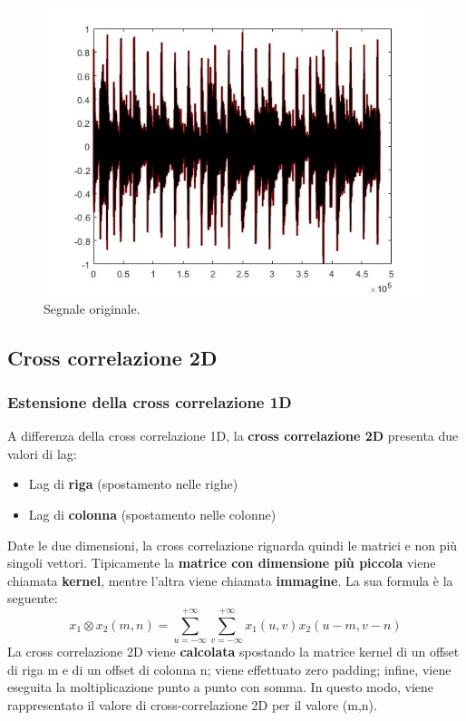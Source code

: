 \documentclass[a4paper]{article}
\begin{document}
	\begin{figure}[!htp]
		\centering
		\includegraphics[width=.9\textwidth]{img/lab/cross-correlazione-10.jpg}
		\caption{Segnale originale.}
	\end{figure}\newpage
	
	\subsection{Cross correlazione 2D}
	
	\subsubsection{Estensione della cross correlazione 1D}
	
	A differenza della cross correlazione 1D, la \textbf{cross correlazione 2D} presenta due valori di lag:
	\begin{itemize}
		\item Lag di \textbf{riga} (spostamento nelle righe)
		
		\item Lag di \textbf{colonna} (spostamento nelle colonne)
	\end{itemize}
	Date le due dimensioni, la cross correlazione riguarda quindi le matrici e non più singoli vettori. Tipicamente la \textbf{matrice con dimensione più piccola} viene chiamata \textbf{kernel}, mentre l'altra viene chiamata \textbf{immagine}. La sua formula è la seguente:
	\begin{equation*}
		x_{1} \otimes x_{2}\left(m, n\right) = \sum_{u = -\infty}^{+\infty} \sum_{v = -\infty}^{+\infty} x_{1}\left(u, v\right) x_{2}\left(u - m, v - n\right)
	\end{equation*}
	La cross correlazione 2D viene \textbf{calcolata} spostando la matrice kernel di un offset di riga \textsf{m} e di un offset di colonna \textsf{n}; viene effettuato zero padding; infine, viene eseguita la moltiplicazione punto a punto con somma. In questo modo, viene rappresentato il valore di cross-correlazione 2D per il valore \textsf{(m,n)}.
	
\end{document}
